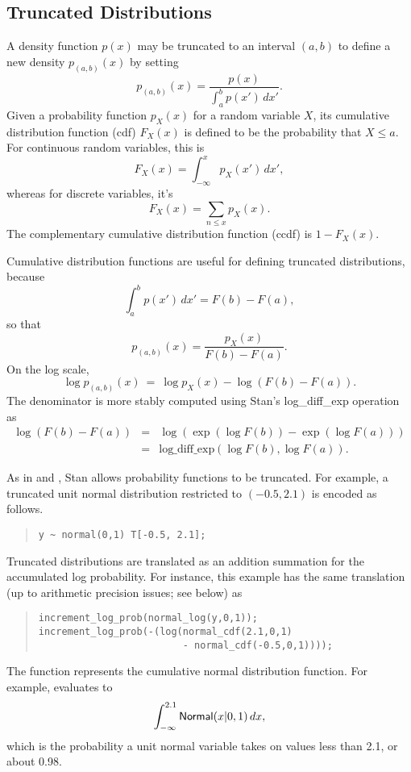 \subsection{Truncated Distributions}

A density function $p(x)$ may be truncated to an interval $(a,b)$ to
define a new density $p_{(a,b)}\!(x)$ by setting
%
\[ 
p_{\!(a,b)\!}(x) = \frac{p(x)}
                  {\int_a^b p(x') \, dx'}.
\] 
Given a probability function $p_X(x)$ for a random variable $X$, its
cumulative distribution function (cdf) $F_X(x)$ is defined to be the
probability that $X \leq a$.  For continuous random variables, this is
\[
F_X(x) = \int_{-\infty}^{x} p_X(x') \, dx',
\]
whereas for discrete variables, it's
\[
F_X(x) = \sum_{n \leq x} p_X(x).
\]
%
The complementary cumulative distribution function (ccdf) is $1 -
F_X(x)$.  

Cumulative distribution functions are useful for defining truncated
distributions, because
\[
\int_a^b p(x') \, dx' = F(b) - F(a),
\]
so that
\[ 
p_{\!(a,b)\!}(x) = \frac{p_X(x)}
                  {F(b) - F(a)}.
\] 
On the log scale,
\[ 
\log p_{\!(a,b)\!}(x) 
\ = \ 
\log p_X(x)
- \log \left( F(b) - F(a) \right).
\]
The denominator is more stably computed using Stan's
log\_diff\_exp operation as
\begin{eqnarray*}
\log \left( F(b) - F(a) \right)
& = & \log \left( \exp(\log F(b)) - \exp(\log F(a)) \right)
\\[6pt]
& = & \mbox{log\_diff\_exp}\!\left( \log F(b), \log F(a) \right).
\end{eqnarray*}



As in \BUGS and \JAGS, Stan allows probability functions to be
truncated.  For example, a truncated unit normal distribution
restricted to $(-0.5, 2.1)$ is encoded as follows.
%
\begin{quote}
\begin{Verbatim}
y ~ normal(0,1) T[-0.5, 2.1];
\end{Verbatim}
\end{quote}
% 
Truncated distributions are translated as an addition summation for
the accumulated log probability.  For instance, this example has the
same translation (up to arithmetic precision issues; see below) as
%
\begin{quote}
\begin{Verbatim}
increment_log_prob(normal_log(y,0,1));
increment_log_prob(-(log(normal_cdf(2.1,0,1)
                         - normal_cdf(-0.5,0,1))));
\end{Verbatim}
\end{quote}
%
The function  represents the cumulative normal
distribution function.  For example, \code{normal\_cdf(2.1,0,1)} evaluates to 
\[
\int_{-\infty}^{2.1} \mbox{\sf Normal}(x|0,1) \, dx,
\]
%
which is the probability a unit normal variable takes on values less
than 2.1, or about 0.98.  

